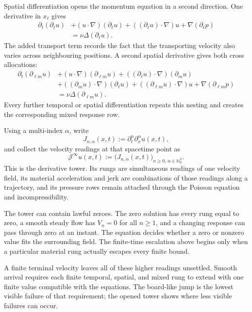 Spatial differentiation opens the momentum equation in a second direction.
One derivative in \(x_\ell\) gives
\[
  \begin{aligned}
  \partial_t(\partial_\ell u)
  &+
  (u\cdot\nabla)(\partial_\ell u)
  +
  ((\partial_\ell u)\cdot\nabla)u
  +
  \nabla(\partial_\ell p)\\
  &=
  \nu\Delta(\partial_\ell u).
  \end{aligned}
\]
The added transport term records the fact that the transporting velocity also varies across neighbouring positions.
A second spatial derivative gives both cross allocations:
\[
  \begin{aligned}
  \partial_t(\partial_{\ell m}u)
  &+
  (u\cdot\nabla)(\partial_{\ell m}u)
  +
  ((\partial_\ell u)\cdot\nabla)(\partial_m u)\\
  &+
  ((\partial_m u)\cdot\nabla)(\partial_\ell u)
  +
  ((\partial_{\ell m}u)\cdot\nabla)u
  +
  \nabla(\partial_{\ell m}p)\\
  &=
  \nu\Delta(\partial_{\ell m}u).
  \end{aligned}
\]
Every further temporal or spatial differentiation repeats this nesting and creates the corresponding mixed response row.

Using a multi-index \(\alpha\), write
\[
  J_{n,\alpha}(x,t)
  :=
  \partial_t^n\partial_x^\alpha u(x,t),
\]
and collect the velocity readings at that spacetime point as
\[
  \mathcal J^\infty u(x,t)
  :=
  \bigl(
    J_{n,\alpha}(x,t)
  \bigr)_{n\geq0,\,\alpha\in\mathbb N_0^3}.
\]
This is the derivative tower.
Its rungs are simultaneous readings of one velocity field, its material acceleration and jerk are combinations of those readings along a trajectory, and its pressure rows remain attached through the Poisson equation and incompressibility.

The tower can contain lawful zeroes.
The zero solution has every rung equal to zero, a smooth steady flow has \(V_n=0\) for all \(n\geq1\), and a changing response can pass through zero at an instant.
The equation decides whether a zero or nonzero value fits the surrounding field.
The finite-time escalation above begins only when a particular material rung actually escapes every finite bound.

A finite terminal velocity leaves all of these higher readings unsettled.
Smooth arrival requires each finite temporal, spatial, and mixed rung to extend with one finite value compatible with the equations.
The board-like jump is the lowest visible failure of that requirement; the opened tower shows where less visible failures can occur.
